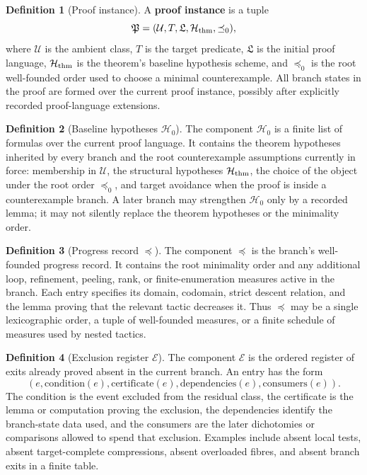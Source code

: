 \documentclass[
  11pt,
]{article}
\theoremstyle{definition}
\newtheorem{definition}{Definition}[section]
\begin{document}
\begin{definition}[Proof instance]\label{def:proof-instance}
A \textbf{proof instance} is a tuple
\[
\mathfrak P=(\mathcal U,T,\mathfrak L,\mathcal H_{\rm thm},\preceq_0),
\]
where \(\mathcal U\) is the ambient class, \(T\) is the target predicate,
\(\mathfrak L\) is the initial proof language,
\(\mathcal H_{\rm thm}\) is the theorem's baseline hypothesis scheme,
and \(\preceq_0\) is the root well-founded order used to choose a
minimal counterexample.  All branch states in the proof are formed over
the current proof instance, possibly after explicitly recorded
proof-language extensions.
\end{definition}

\begin{definition}[Baseline hypotheses \(\mathcal H_0\)]\label{def:baseline-hypotheses}
The component \(\mathcal H_0\) is a finite list of formulas over the
current proof language.  It contains the theorem hypotheses inherited
by every branch and the root counterexample assumptions currently in
force: membership in \(\mathcal U\), the structural hypotheses
\(\mathcal H_{\rm thm}\), the choice of the object under the root order
\(\preceq_0\), and target avoidance when the proof is inside a
counterexample branch.  A later branch may strengthen \(\mathcal H_0\)
only by a recorded lemma; it may not silently replace the theorem
hypotheses or the minimality order.
\end{definition}

\begin{definition}[Progress record \(\preceq\)]\label{def:progress-record}
The component \(\preceq\) is the branch's well-founded progress record.
It contains the root minimality order and any additional loop,
refinement, peeling, rank, or finite-enumeration measures active in the
branch.  Each entry specifies its domain, codomain, strict descent
relation, and the lemma proving that the relevant tactic decreases it.
Thus \(\preceq\) may be a single lexicographic order, a tuple of
well-founded measures, or a finite schedule of measures used by nested
tactics.
\end{definition}

\begin{definition}[Exclusion register \(\mathcal E\)]\label{def:exclusion-register}
The component \(\mathcal E\) is the ordered register of exits already
proved absent in the current branch.  An entry has the form
\[
(e,\mathrm{condition}(e),\mathrm{certificate}(e),
  \mathrm{dependencies}(e),\mathrm{consumers}(e)).
\]
The condition is the event excluded from the residual class, the
certificate is the lemma or computation proving the exclusion, the
dependencies identify the branch-state data used, and the consumers are
the later dichotomies or comparisons allowed to spend that exclusion.
Examples include absent local tests, absent target-complete
compressions, absent overloaded fibres, and absent branch exits in a
finite table.
\end{definition}
\end{document}

